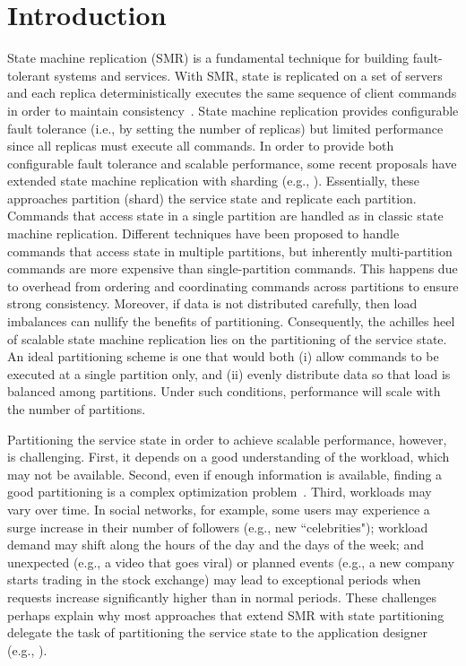\section{Introduction}

State machine replication (SMR) is a fundamental technique for building fault-tolerant systems and services. 
With SMR, state is replicated on a set of servers and each replica deterministically executes the same sequence of client commands in order to maintain consistency~\cite{Lam78,Sch90}. 
State machine replication provides configurable fault tolerance (i.e., by setting the number of replicas) but limited performance since all replicas must execute all commands.
%
In order to provide both configurable fault tolerance and scalable performance, some recent proposals have extended state machine replication with sharding (e.g., \cite{Aguilera:2007, bezerra2014ssmr,corbett2013spanner,Glendenning:2011kj,
  bli16edcc}).
Essentially, these approaches partition (shard) the service state and replicate each partition.
Commands that access state in a single partition are handled as in classic state machine replication.
Different techniques have been proposed to handle commands that access state in multiple partitions, but inherently multi-partition commands are more expensive than single-partition commands.
This happens due to overhead from ordering and coordinating commands across partitions to ensure strong consistency.
Moreover, if data is not distributed carefully, then load imbalances can nullify the benefits of partitioning. 
Consequently, the achilles heel of scalable state machine replication lies on the partitioning of the service state.
An ideal partitioning scheme is one that would both (i) allow commands to be executed at a single partition only, and (ii) evenly distribute data so that load is balanced among partitions.
Under such conditions, performance will scale with the number of partitions.

Partitioning the service state in order to achieve scalable performance, however, is challenging.
First, it depends on a good understanding of the workload, which may not be available.
Second, even if enough information is available, finding a good partitioning is a complex optimization problem~\cite{curino2010sch,taft2014est}. 
Third, workloads may vary over time. 
In social networks, for example, some users may experience a surge increase in their number of followers (e.g., new ``celebrities"); workload demand may shift along the hours of the day and the days of the week; and unexpected (e.g., a video that goes viral) or planned events (e.g., a new company starts trading in the stock exchange) may lead to exceptional periods when requests increase significantly higher than in normal periods.
These challenges perhaps explain why most approaches that extend SMR with state partitioning delegate the task of partitioning the service state to the application designer (e.g., \cite{Aguilera:2007, bezerra2014ssmr,corbett2013spanner,bli16edcc}).

